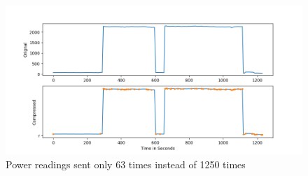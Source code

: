 \begin{figure} 
	\centering
	\includegraphics[width=1\linewidth]{images/compressRish}
	\caption[Power readings sent only 63 times instead of 1250 times]{Power readings sent only 63 times instead of 1250 times}
	\label{fig:compressRish}
\end{figure}
